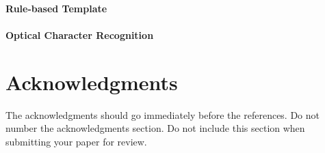 \documentclass[11pt,a4paper]{article}
\begin{document}
\paragraph{Rule-based Template}
\paragraph{Optical Character Recognition}



\section*{Acknowledgments}

The acknowledgments should go immediately before the references. Do not number the acknowledgments section.
Do not include this section when submitting your paper for review.



\end{document}

